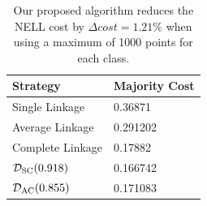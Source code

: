 \begin{table}[h]
    \centering
    \begin{tabular}{|l | l|}
    \hline
    Strategy & Majority Cost\\ \hline
    Single Linkage & 0.36871\\
    Average Linkage & 0.291202\\
    Complete Linkage & 0.17882\\
    $\mathcal{D}_\text{SC}(0.918)$ & 0.166742\\
    $\mathcal{D}_\text{AC}(0.855)$ & 0.171083\\\hline
    \end{tabular}
    \caption{Our proposed algorithm reduces the NELL cost by $\Delta cost = 1.21\%$ when using a maximum of 1000 points for each class.}
    \label{table:nell1000}
\end{table}

